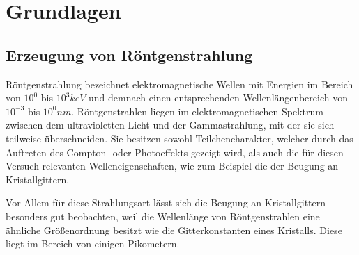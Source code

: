 \section{Grundlagen} %
\label{sec:grundlagen}







	\subsection{Erzeugung von Röntgenstrahlung} %
	\label{sub:erzeugung_von_rntgenstrahlung}

		Röntgenstrahlung bezeichnet elektromagnetische Wellen mit Energien im Bereich von $10^{0}$ bis $10^3\unit{keV}$ und demnach einen entsprechenden Wellenlängenbereich von $10^{-3}$ bis $10^0\unit{nm}$.
		Röntgenstrahlen liegen im elektromagnetischen Spektrum zwischen dem ultravioletten Licht und der Gammastrahlung, mit der sie sich teilweise überschneiden.
		Sie besitzen sowohl Teilchencharakter, welcher durch das Auftreten des Compton- oder Photoeffekts gezeigt wird, als auch die für diesen Versuch relevanten Welleneigenschaften, wie zum Beispiel die der Beugung an Kristallgittern.

		Vor Allem für diese Strahlungsart lässt sich die Beugung an Kristallgittern besonders gut beobachten, weil die Wellenlänge von Röntgenstrahlen eine ähnliche Größenordnung besitzt wie die Gitterkonstanten eines Kristalls.
		Diese liegt im Bereich von einigen Pikometern.

